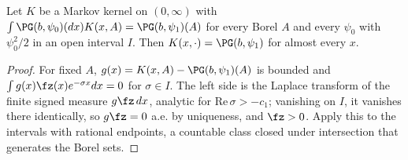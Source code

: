 \begin{lemma}\label{lem:complete}
Let $K$ be a Markov kernel on $(0,\infty)$ with $\int\PG(b,\psi_0)(dx)K(x,A)=\PG(b,\psi_1)(A)$ for every Borel
$A$ and every $\psi_0$ with $\psi_0^2/2$ in an open interval $I$. Then $K(x,\cdot)=\PG(b,\psi_1)$ for almost every
$x$.
\end{lemma}
\begin{proof}
For fixed $A$, $g(x)=K(x,A)-\PG(b,\psi_1)(A)$ is bounded and $\int g(x)\fz(x)e^{-\sigma x}dx=0$ for $\sigma\in I$.
The left side is the Laplace transform of the finite signed measure $g\fz\,dx$, analytic for $\mathrm{Re}\,\sigma>
-c_1$; vanishing on $I$, it vanishes there identically, so $g\fz=0$ a.e. by uniqueness, and $\fz>0$. Apply this to
the intervals with rational endpoints, a countable class closed under intersection that generates the Borel sets.
\end{proof}

